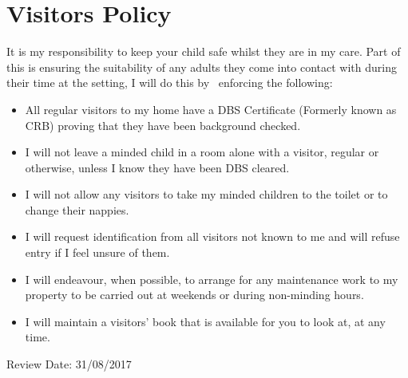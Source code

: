 

\section{Visitors Policy}

It is my responsibility to keep your child safe whilst they are in my
care. Part of this is ensuring the suitability of any adults they come
into contact with during their time at the setting, I will do this by
~enforcing the following:

\begin{itemize}
\item
  All regular visitors to my home have a DBS Certificate (Formerly
  known as CRB) proving that they have been background checked.
\end{itemize}

\begin{itemize}
\item
  I will not leave a minded child in a room alone with a visitor,
  regular or otherwise, unless I know they have been DBS cleared.~
\item
  I will not allow any visitors to take my minded children to the
  toilet or to change their nappies.
\end{itemize}

\begin{itemize}
\item
  I will request identification from all visitors not known to me and
  will refuse entry if I feel unsure of them.
\end{itemize}

\begin{itemize}
\item
  I will endeavour, when possible, to arrange for any maintenance work
  to my property to be carried out at weekends or during non-minding
  hours.
\end{itemize}

\begin{itemize}
\item
  I will maintain a visitors' book that is available for you to look
  at, at any time.
\end{itemize}

Review Date: 31/08/2017


